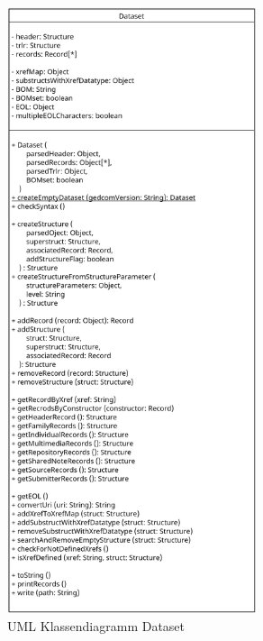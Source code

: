 \begin{figure}[h]
	\centering
	\includegraphics[width=0.65\textwidth]{images/UML_Class_Dataset.png}
	\caption{UML Klassendiagramm Dataset}
	\label{fig: UML Klassendiagramm Dataset}
\end{figure}


